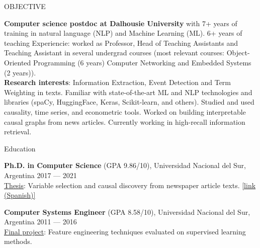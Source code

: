 \documentclass{resume} %
\begin{document}

\vspace{-0.3cm}     
\begin{rSection}{OBJECTIVE}

{\textbf{Computer science postdoc at Dalhousie University} with 7+ years of training in natural language (NLP) and Machine Learning (ML). 6+ years of teaching Experiencie: worked as Professor, Head of Teaching Assistants and Teaching Assistant in several undergrad courses (most relevant courses: Object-Oriented Programming (6 years) Computer Networking and Embedded Systems (2 years)). \\
 \textbf{Research interests}: Information Extraction, Event Detection and Term Weighting in texts. Familiar with state-of-the-art ML and NLP technologies and libraries (spaCy, HuggingFace, Keras, Scikit-learn, and others). Studied and used causality, time series, and econometric tools. Worked on building interpretable causal graphs from news articles. 
Currently working in high-recall information retrieval.  
}
\vspace{-0.2cm}


\end{rSection}

\begin{rSection}{Education}

{\bf Ph.D. in Computer Science} (GPA 9.86/10), Universidad Nacional del Sur, Argentina \hfill {2017 --- 2021}\\
\underline{Thesis}: Variable selection and causal discovery from  newspaper article texts. \href{https://repositoriodigital.uns.edu.ar/bitstream/handle/123456789/5827/MAISONNAVE\%20M._TESIS.pdf?sequence=2&isAllowed=y}{[link (Spanish)]}\\


\vspace{-0.4cm}

{\bf Computer Systems Engineer} (GPA 8.58/10), Universidad Nacional del Sur, Argentina \hfill {2011 --- 2016}\\
\underline{Final project}: Feature engineering techniques evaluated on supervised learning methods.

\vspace{-0.2cm}
\end{rSection}
\end{document}
